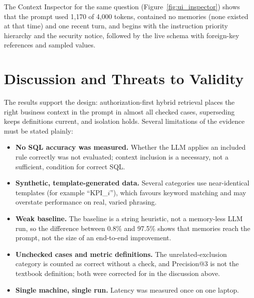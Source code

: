 \begin{figure}[H]
    \centering
\end{figure}

The Context Inspector for the same question (Figure~\ref{fig:ui_inspector}) shows that the
prompt used 1,170 of 4,000 tokens, contained no memories (none existed at that time) and one
recent turn, and begins with the instruction priority hierarchy and the security notice,
followed by the live schema with foreign-key references and sampled values.

\begin{figure}[H]
    \centering
\end{figure}

\section{Discussion and Threats to Validity}
The results support the design: authorization-first hybrid retrieval places the right
business context in the prompt in almost all checked cases, superseding keeps definitions
current, and isolation holds. Several limitations of the evidence must be stated plainly:
\begin{itemize}[leftmargin=*, topsep=4pt, itemsep=3pt]
    \item \textbf{No SQL accuracy was measured.} Whether the LLM applies an included rule
          correctly was not evaluated; context inclusion is a necessary, not a sufficient,
          condition for correct SQL.
    \item \textbf{Synthetic, template-generated data.} Several categories use near-identical
          templates (for example ``KPI\_$i$''), which favours keyword matching and may
          overstate performance on real, varied phrasing.
    \item \textbf{Weak baseline.} The baseline is a string heuristic, not a memory-less LLM
          run, so the difference between 0.8\% and 97.5\% shows that memories reach the
          prompt, not the size of an end-to-end improvement.
    \item \textbf{Unchecked cases and metric definitions.} The unrelated-exclusion category
          is counted as correct without a check, and Precision@3 is not the textbook
          definition; both were corrected for in the discussion above.
    \item \textbf{Single machine, single run.} Latency was measured once on one laptop.
\end{itemize}

